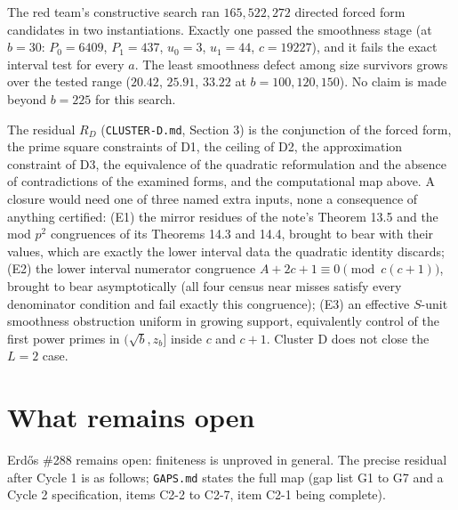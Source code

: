 \documentclass[11pt]{article}
\theoremstyle{remark}
\begin{document}
The red team's constructive search ran $165{,}522{,}272$ directed forced form candidates in two instantiations. Exactly one passed the smoothness stage (at $b = 30$: $P_0 = 6409$, $P_1 = 437$, $u_0 = 3$, $u_1 = 44$, $c = 19227$), and it fails the exact interval test for every $a$. The least smoothness defect among size survivors grows over the tested range ($20.42$, $25.91$, $33.22$ at $b = 100, 120, 150$). No claim is made beyond $b = 225$ for this search.

The residual $R_D$ (\texttt{CLUSTER-D.md}, Section 3) is the conjunction of the forced form, the prime square constraints of D1, the ceiling of D2, the approximation constraint of D3, the equivalence of the quadratic reformulation and the absence of contradictions of the examined forms, and the computational map above. A closure would need one of three named extra inputs, none a consequence of anything certified: (E1) the mirror residues of the note's Theorem 13.5 and the mod $p^2$ congruences of its Theorems 14.3 and 14.4, brought to bear with their values, which are exactly the lower interval data the quadratic identity discards; (E2) the lower interval numerator congruence $A + 2c + 1 \equiv 0 \pmod{c(c+1)}$, brought to bear asymptotically (all four census near misses satisfy every denominator condition and fail exactly this congruence); (E3) an effective $S$-unit smoothness obstruction uniform in growing support, equivalently control of the first power primes in $(\sqrt{b}, z_b]$ inside $c$ and $c+1$. Cluster D does not close the $L = 2$ case.

\section{What remains open}

Erd\H{o}s \#288 remains open: finiteness is unproved in general. The precise residual after Cycle 1 is as follows; \texttt{GAPS.md} states the full map (gap list G1 to G7 and a Cycle 2 specification, items C2-2 to C2-7, item C2-1 being complete).
\end{document}
